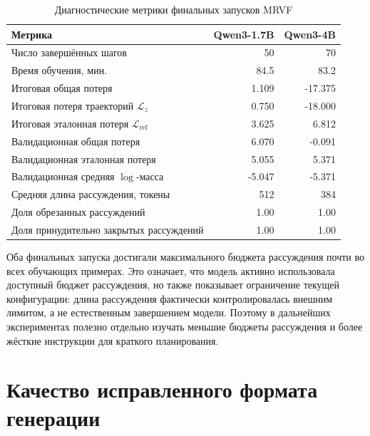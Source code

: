 \begin{table}[h]
  \centering
  \caption{Диагностические метрики финальных запусков MRVF}
  \label{tab:training-diagnostics}
  \begin{tabular}{lrr}
    \hline
    Метрика                                                  & Qwen3-1.7B & Qwen3-4B \\
    \hline
    Число завершённых шагов                                  & 50         & 70       \\
    Время обучения, мин.                                     & 84.5       & 83.2     \\
    Итоговая общая потеря                                    & 1.109      & -17.375  \\
    Итоговая потеря траекторий \(\mathcal{L}_{z}\)           & 0.750      & -18.000  \\
    Итоговая эталонная потеря \(\mathcal{L}_{\mathrm{ref}}\) & 3.625      & 6.812    \\
    Валидационная общая потеря                               & 6.070      & -0.091   \\
    Валидационная эталонная потеря                           & 5.055      & 5.371    \\
    Валидационная средняя \(\log\)-масса                     & -5.047     & -5.371   \\
    Средняя длина рассуждения, токены                        & 512        & 384      \\
    Доля обрезанных рассуждений                              & 1.00       & 1.00     \\
    Доля принудительно закрытых рассуждений                  & 1.00       & 1.00     \\
    \hline
  \end{tabular}
\end{table}

Оба финальных запуска достигали максимального бюджета рассуждения почти во всех обучающих примерах. Это означает, что модель активно использовала доступный бюджет рассуждения, но также показывает ограничение текущей конфигурации: длина рассуждения фактически контролировалась внешним лимитом, а не естественным завершением модели. Поэтому в дальнейших экспериментах полезно отдельно изучать меньшие бюджеты рассуждения и более жёсткие инструкции для краткого планирования.

\section{Качество исправленного формата генерации}

